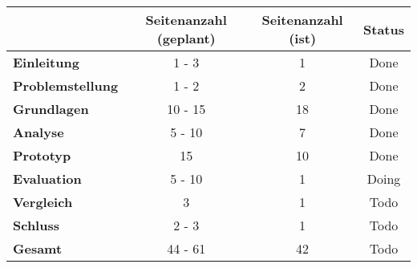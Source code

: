 \begin{table}[H]
\centering
\begin{tabular}{l|c|c|c}
                               & \textbf{Seitenanzahl (geplant)} & \textbf{Seitenanzahl (ist)} & \textbf{Status}        \\ \hline
\textbf{Einleitung}            & 1 - 3                           & {\color{yellow} 1}          & {\color{green} Done}   \\ \hline
\textbf{Problemstellung}       & 1 - 2                           & {\color{green} 2}           & {\color{green} Done}   \\ \hline
\textbf{Grundlagen}            & 10 - 15                         & {\color{yellow} 18}         & {\color{green} Done}   \\ \hline
\textbf{Analyse}               & 5 - 10                          & {\color{green} 7}           & {\color{green} Done}   \\ \hline
\textbf{Prototyp}              & 15                              & {\color{yellow} 10}         & {\color{green} Done}   \\ \hline
\textbf{Evaluation}            & 5 - 10                          & {\color{red} 1}             & {\color{yellow} Doing} \\ \hline
\textbf{Vergleich}             & 3                               & {\color{red} 1}             & {\color{red} Todo}     \\ \hline
\textbf{Schluss}               & 2 - 3                           & {\color{red} 1}             & {\color{red} Todo}     \\ \hline
\textbf{Gesamt}                & 44 - 61                         & {\color{yellow} 42}         & {\color{red} Todo}     \\
\end{tabular}
\end{table}